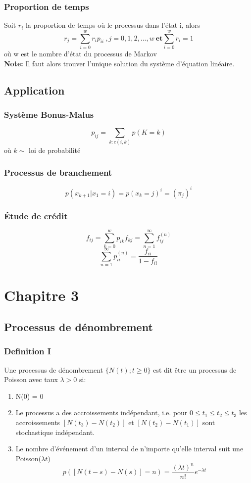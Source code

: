 \documentclass[13pt]{article}
\begin{document}
\subsubsection*{Proportion de temps}
Soit $r_i$ la proportion de temps où le processus dans l'état i, alors 
\[ r_j = \sum_{i=0}^w r_i p_{ii}\:,j=0,1,2,...,w\: \textbf{et} \sum_{i=0}^w r_i = 1 \]
où w est le nombre d'état du processus de Markov \\
\textbf{Note:} Il faut alors trouver l'unique solution du système d'équation linéaire.

\subsection*{Application}

\subsubsection*{Système Bonus-Malus}
\[ p_{ij} = \sum_{k:c(i,k)} p(K = k) \] 
où $k \sim$ loi de probabilité 

\subsubsection*{Processus de branchement}
\[ p(x_{k+1}|x_1 = i) = p(x_k = j)^i = (\pi_j)^i \]


\subsubsection*{Étude de crédit}

\[ f_{ij} = \sum_{k=0}^w p_{ik} f_{kj} = \sum_{n=1}^\infty f_{ij}^{(n)} \]
\[ \sum_{n=1}^\infty p_{ii}^{(n)} = \frac{f_{ii}}{1 - f_{ii}} \]

\section*{Chapitre 3}
\subsection*{Processus de dénombrement}
\subsubsection*{Definition I}
Une processus de dénombrement $\{ N(t);t \geq 0 \}$ est dit être un processus de Poisson avec taux $\lambda > 0$ si:
\begin{enumerate}
  \item N(0) = 0
  \item Le processus a des accroissements indépendant, i.e. pour $0 \leq t_1 \leq t_2 \leq t_3$ les accroissements $[N(t_3) - N(t_2)]$ et $[N(t_2) - N(t_1)]$ 
        sont stochastique indépendant.
  \item Le nombre d'événement d'un interval de n'importe qu'elle interval suit une Poisson($\lambda t$)
        \[ p([N(t-s) - N(s)] = n) = \frac{(\lambda t)^n}{n!} e^{-\lambda t} \]
\end{enumerate}
\end{document}

